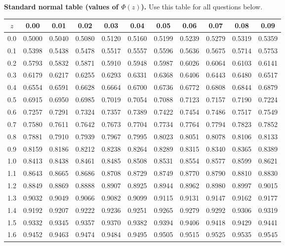 \bigskip
\noindent\textbf{Standard normal table (values of \(\Phi(z)\)).} Use this table for all questions below.
\begin{center}
\begin{tabular}{c|cccccccccc}
\toprule
$z$ & 0.00 & 0.01 & 0.02 & 0.03 & 0.04 & 0.05 & 0.06 & 0.07 & 0.08 & 0.09 \\
\midrule
0.0 & 0.5000 & 0.5040 & 0.5080 & 0.5120 & 0.5160 & 0.5199 & 0.5239 & 0.5279 & 0.5319 & 0.5359 \\
0.1 & 0.5398 & 0.5438 & 0.5478 & 0.5517 & 0.5557 & 0.5596 & 0.5636 & 0.5675 & 0.5714 & 0.5753 \\
0.2 & 0.5793 & 0.5832 & 0.5871 & 0.5910 & 0.5948 & 0.5987 & 0.6026 & 0.6064 & 0.6103 & 0.6141 \\
0.3 & 0.6179 & 0.6217 & 0.6255 & 0.6293 & 0.6331 & 0.6368 & 0.6406 & 0.6443 & 0.6480 & 0.6517 \\
0.4 & 0.6554 & 0.6591 & 0.6628 & 0.6664 & 0.6700 & 0.6736 & 0.6772 & 0.6808 & 0.6844 & 0.6879 \\
0.5 & 0.6915 & 0.6950 & 0.6985 & 0.7019 & 0.7054 & 0.7088 & 0.7123 & 0.7157 & 0.7190 & 0.7224 \\
0.6 & 0.7257 & 0.7291 & 0.7324 & 0.7357 & 0.7389 & 0.7422 & 0.7454 & 0.7486 & 0.7517 & 0.7549 \\
0.7 & 0.7580 & 0.7611 & 0.7642 & 0.7673 & 0.7704 & 0.7734 & 0.7764 & 0.7794 & 0.7823 & 0.7852 \\
0.8 & 0.7881 & 0.7910 & 0.7939 & 0.7967 & 0.7995 & 0.8023 & 0.8051 & 0.8078 & 0.8106 & 0.8133 \\
0.9 & 0.8159 & 0.8186 & 0.8212 & 0.8238 & 0.8264 & 0.8289 & 0.8315 & 0.8340 & 0.8365 & 0.8389 \\
1.0 & 0.8413 & 0.8438 & 0.8461 & 0.8485 & 0.8508 & 0.8531 & 0.8554 & 0.8577 & 0.8599 & 0.8621 \\
1.1 & 0.8643 & 0.8665 & 0.8686 & 0.8708 & 0.8729 & 0.8749 & 0.8770 & 0.8790 & 0.8810 & 0.8830 \\
1.2 & 0.8849 & 0.8869 & 0.8888 & 0.8907 & 0.8925 & 0.8944 & 0.8962 & 0.8980 & 0.8997 & 0.9015 \\
1.3 & 0.9032 & 0.9049 & 0.9066 & 0.9082 & 0.9099 & 0.9115 & 0.9131 & 0.9147 & 0.9162 & 0.9177 \\
1.4 & 0.9192 & 0.9207 & 0.9222 & 0.9236 & 0.9251 & 0.9265 & 0.9279 & 0.9292 & 0.9306 & 0.9319 \\
1.5 & 0.9332 & 0.9345 & 0.9357 & 0.9370 & 0.9382 & 0.9394 & 0.9406 & 0.9418 & 0.9429 & 0.9441 \\
1.6 & 0.9452 & 0.9463 & 0.9474 & 0.9484 & 0.9495 & 0.9505 & 0.9515 & 0.9525 & 0.9535 & 0.9545 \\

\end{tabular}
\end{center}
